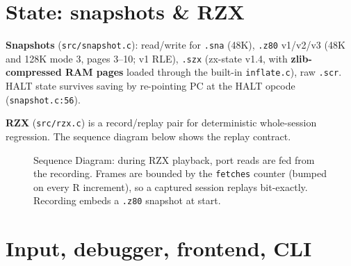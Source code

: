 \documentclass[11pt,a4paper]{article}
\begin{document}
\section{State: snapshots \& RZX}

\textbf{Snapshots} (\texttt{src/snapshot.c}): read/write for \texttt{.sna}
(48K), \texttt{.z80} v1/v2/v3 (48K and 128K mode 3, pages 3--10; v1 RLE),
\texttt{.szx} (zx-state v1.4, with \textbf{zlib-compressed RAM pages} loaded
through the built-in \texttt{inflate.c}), raw \texttt{.scr}. HALT state survives
saving by re-pointing PC at the HALT opcode (\texttt{snapshot.c:56}).

\textbf{RZX} (\texttt{src/rzx.c}) is a record/replay pair for deterministic
whole-session regression. The sequence diagram below shows the replay contract.

\begin{figure}[h]\centering
{}
\caption{Sequence Diagram: during RZX playback, port reads are fed from the
recording. Frames are bounded by the \texttt{fetches} counter (bumped on every
R increment), so a captured session replays bit-exactly. Recording embeds a
\texttt{.z80} snapshot at start.}
\end{figure}

\section{Input, debugger, frontend, CLI}
\end{document}
